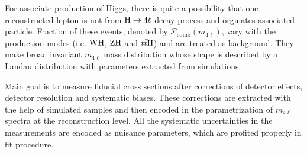 \par
For associate production of Higgs, there is quite a possibility that one reconstructed lepton is not from $\mathrm{H}\rightarrow4\ell$ decay process and orginates associated particle. Fraction of these events, denoted by $\mathcal{P}_{\mathrm{comb}}(m_{4\ell})$, vary with the production modes (i.e. ${\rm WH}$, ${\rm ZH}$ and $t\bar{t}{\rm H}$) and are treated as background. They make broad invariant $m_{4\ell}$ mass distribution whose shape is described by a Landau distribution with parameters extracted from simulations.  
%
\par  Main goal is to measure fiducial cross sections after corrections of detector effects, detector resolution and systematic biases. 
These 
corrections are extracted with the help of simulated samples and then encoded in the parametrization of $m_{4\ell}$ spectra at the 
reconstruction level. 
All the systematic uncertainties in the measurements are encoded as nuisance parameters, which are profited properly in fit procedure.

